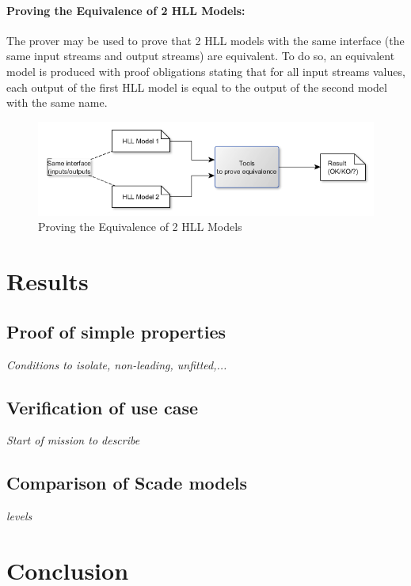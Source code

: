 \documentclass{article}
\begin{document}
\paragraph{ Proving the Equivalence of 2 HLL Models: } The prover may be used to prove that 2 HLL models with the same interface (the same input streams and output streams) are equivalent. To do so, an equivalent model is produced with proof obligations stating that for all input streams values, each output of the first HLL model is equal to the output of the second model with the same name.
\begin{figure}[h!]
\centering
\includegraphics[width=1\textwidth]{Use_equivalence_checker}
\caption{Proving the Equivalence of 2 HLL Models}
\label{fig:eqch}
\end{figure}








\section{Results}

\subsection{Proof of simple properties}

\emph{Conditions to isolate, non-leading, unfitted,...}

\subsection{Verification of use case}

\emph{Start of mission to describe}

\subsection{Comparison of Scade models}

\emph{levels}

\section{Conclusion}
\end{document}
